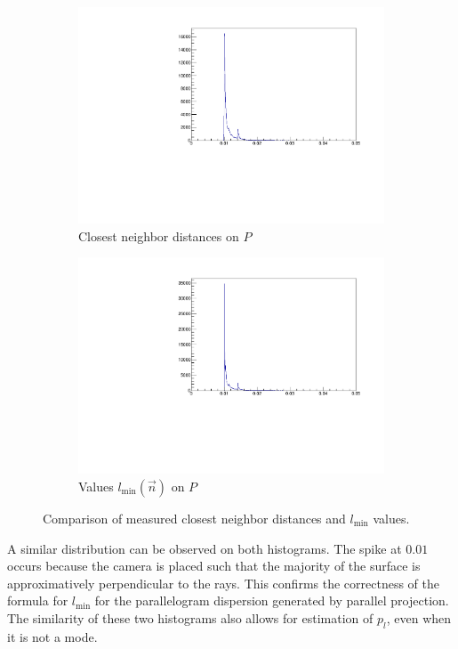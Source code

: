 \begin{figure}[H]
\centering
\begin{subfigure}{.5\textwidth}
	\includegraphics[width=\linewidth]{fig/nn.pdf}
	\caption{Closest neighbor distances on $P$}
\end{subfigure}%
\begin{subfigure}{.5\textwidth}
	\includegraphics[width=\linewidth]{fig/nn_lmin.pdf}
	\caption{Values $l_{\text{min}}(\vec{n})$ on $P$}
\end{subfigure}	
\caption{Comparison of measured closest neighbor distances and $l_\text{min}$ values.}
\label{fig:relief_nn_hist}
\end{figure}

A similar distribution can be observed on both histograms. The spike at $0.01$ occurs because the camera is placed such that the majority of the surface is approximatively perpendicular to the rays. This confirms the correctness of the formula for $l_{\text{min}}$ for the parallelogram dispersion generated by parallel projection. The similarity of these two histograms also allows for estimation of $p_l$, even when it is not a mode.
 
